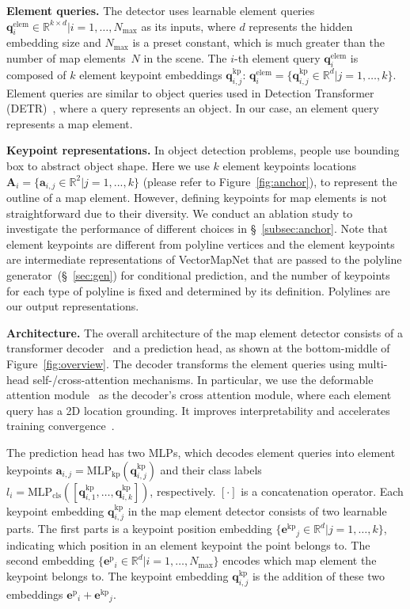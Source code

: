 \documentclass{article}
\theoremstyle{plain}
\theoremstyle{definition}
\theoremstyle{remark}
\begin{document}
\noindent\textbf{Element queries.}
The detector uses learnable element queries ${\bm{q}_{i}^{\mathrm{elem}}\in\mathbb{R}^{k\times d}| i=1,\dots,N_{\mathrm{max}}}$ as its inputs, where $d$ represents the hidden embedding size and $N_{\mathrm{max}}$ is a preset constant, which is much greater than the number of map elements~$N$ in the scene. The $i$-th element query $\bm{q}_{i}^{\mathrm{elem}}$ is composed of $k$ element keypoint embeddings $\bm{q}^{\mathrm{kp}}_{i,j}$: $\bm{q}^{\mathrm{elem}}_{i} = \{\bm{q}^{\mathrm{kp}}_{i,j}\in\mathbb{R}^d | j=1,\dots,k\}$.
Element queries are similar to object queries used in Detection Transformer (DETR)~\citep{carion2020end}, where a query represents an object. In our case, an element query represents a map element.

\noindent\textbf{Keypoint representations.} 
In object detection problems, people use bounding box to abstract object shape. Here we use $k$ element keypoints locations $\bm{A}_i = \{\bm{a}_{i,j}\in\mathbb{R}^2|j=1,...,k\}$ (please refer to Figure~\ref{fig:anchor}), to represent the outline of a map element. However, defining keypoints for map elements is not straightforward due to their diversity. We conduct an ablation study to investigate the performance of different choices in \S~\ref{subsec:anchor}. 
Note that element keypoints are different from polyline vertices and the element keypoints are intermediate representations of VectorMapNet that are passed to the polyline generator~(\S~\ref{sec:gen}) for conditional prediction, and the number of keypoints for each type of polyline is fixed and determined by its definition. Polylines are our output representations.


\noindent\textbf{Architecture.}
The overall architecture of the map element detector consists of a transformer decoder~\citep{vaswani2017attention} and a prediction head, as shown at the bottom-middle of Figure~\ref{fig:overview}. 
The decoder transforms the element queries using multi-head self-/cross-attention mechanisms. 
In particular, we use the deformable attention module~\citep{zhu2020deformable} as the decoder's cross attention module, where each element query has a 2D location grounding. It improves interpretability and accelerates training convergence~\citep{li2022dn}.

The prediction head has two MLPs, which decodes element queries into element keypoints $ \bm{a}_{i,j}=\mathrm{MLP_{kp}}(\bm{q}^{\mathrm{kp}}_{i,j})$ and their class labels $l_i = \mathrm{MLP_{cls}}([\bm{q}^{\mathrm{kp}}_{i,1}, \dots, \bm{q}^{\mathrm{kp}}_{i,k}])$, respectively. $[\cdot]$ is a concatenation operator.
Each keypoint embedding $\bm{q}^{\mathrm{kp}}_{i,j}$ in the map element detector consists of two learnable parts.
The first parts is a keypoint position embedding $\{\bm{e^{\mathrm{kp}}}_{j}\in\mathbb{R}^d| j=1,\dots,k \}$, indicating which position in an element keypoint the point belongs to. The second embedding $\{\bm{e^{\mathrm{p}}}_{i}\in\mathbb{R}^d | i=1,\dots,N_{\mathrm{max}} \}$ encodes which map element the keypoint belongs to. The keypoint embedding $\bm{q}^{\mathrm{kp}}_{i,j}$ is the addition of these two embeddings $\bm{e^{\mathrm{p}}}_{i}+\bm{e^{\mathrm{kp}}}_{j}$.
\end{document}
